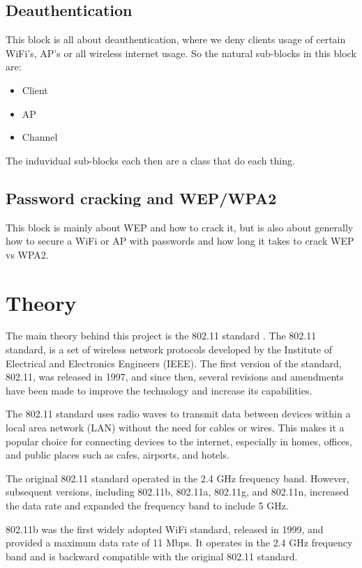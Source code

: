 \subsection{Deauthentication}
This block is all about deauthentication, where we deny clients usage of certain WiFi's, AP's or all wireless internet usage. So the natural sub-blocks in this block are: 
\begin{itemize}
    \item Client
    \item AP
    \item Channel
\end{itemize}

The induvidual sub-blocks each then are a class that do each thing. 

\subsection{Password cracking and WEP/WPA2}
This block is mainly about WEP and how to crack it, but is also about generally how to secure a WiFi or AP with passwords and how long it takes to crack WEP vs WPA2. 



\section{Theory}
The main theory behind this project is the 802.11 standard \cite{IEEE802.11}.
The 802.11 standard, is a set of wireless network protocols developed by the Institute of Electrical and Electronics Engineers (IEEE). The first version of the standard, 802.11, was released in 1997, and since then, several revisions and amendments have been made to improve the technology and increase its capabilities.

The 802.11 standard uses radio waves to transmit data between devices within a local area network (LAN) without the need for cables or wires. This makes it a popular choice for connecting devices to the internet, especially in homes, offices, and public places such as cafes, airports, and hotels.

The original 802.11 standard operated in the 2.4 GHz frequency band. However, subsequent versions, including 802.11b, 802.11a, 802.11g, and 802.11n, increased the data rate and expanded the frequency band to include 5 GHz.

802.11b was the first widely adopted WiFi standard, released in 1999, and provided a maximum data rate of 11 Mbps. It operates in the 2.4 GHz frequency band and is backward compatible with the original 802.11 standard.

